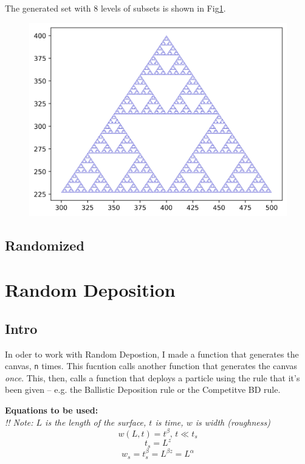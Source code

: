 \documentclass[12pt]{article}
\begin{document}
		The generated set with 8 levels of subsets is shown in Fig\ref{fig:serpDet}.
		\begin{figure}[h!]
			\centering
			\includegraphics[width=.9\linewidth]{../P2/fractalstuff.jpg}
			\label{fig:serpDet}
		\end{figure}
		\subsection{Randomized}
	\section{Random Deposition}
	\subsection{Intro}
	In oder to work with Random Depostion, I made a function that generates the canvas,
	\texttt{n} times. This fucntion calls another function that generates the canvas
	\emph{once}. This, then, calls a function that deploys a particle using the rule that it's been
	given -- e.g. the Ballistic Deposition rule or the Competitve BD rule.
	
	\textbf{Equations to be used:}\\
	\emph{!! Note: $L$ is the length of the surface, $t$ is time, $w$ is width (roughness)}
	\begin{equation}
		w(L, t) = t^{\beta}, \, t \ll t_s
		\label{eq:beta}
	\end{equation}
	\begin{equation}
		t_s = L^z
		\label{eq:z}
	\end{equation}
	\begin{equation}
		w_s = t_s^\beta = L^{\beta z} = L^\alpha
		\label{eq:alpha}
	\end{equation}
	
\end{document}
